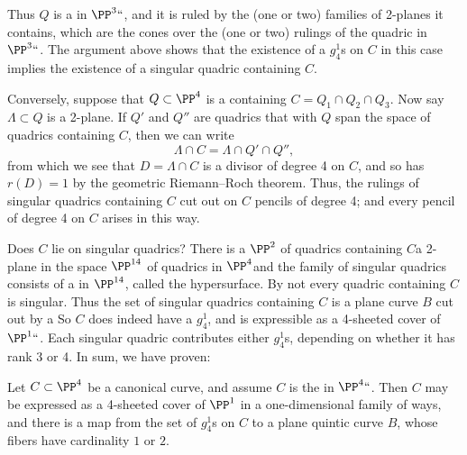 Thus $Q$ is a
%
in $\PP^3` `$, and it is ruled by
the (one or two) families of 2-planes it contains, which are the cones
over the (one or two) rulings of the quadric in $\PP^3` `$. The
argument above shows that the existence of a $g_4^1$s on $C$ in this
case implies the existence of a singular quadric containing $C$.

Conversely, suppose that $Q \subset \PP^4$ is a
containing $C = Q_1 \cap Q_2 \cap Q_3$. Now say $\Lambda \subset Q$ is
a 2-plane. If $Q'$ and $Q''$ are quadrics that with $Q$ span the
space of quadrics containing $C$, then we can write
$$
\Lambda \cap C = \Lambda \cap Q' \cap Q'',
$$
from which we see that $D = \Lambda \cap C$ is a divisor of degree 4
on $C$, and so has $r(D) = 1$ by the geometric Riemann--Roch theorem.
%
Thus, the rulings of  singular quadrics containing $C$ cut out on $C$
pencils of degree 4; and every pencil of degree 4 on $C$ arises in
this way.

Does $C$ lie on singular quadrics? There is a $\PP^2$ of quadrics
containing $C$\emdash a 2-plane in the space $\PP^{14}$ of quadrics in
$\PP^4$\emdash and the family of singular quadrics  consists of a
%
in $\PP^{14}$, called the
%
%
hypersurface. By
not every quadric containing $C$
is singular. Thus the set of singular quadrics containing $C$ is a
plane curve $B$ cut out by a
%
So $C$ does indeed have
a $g^1_4$, and is expressible as a
4-sheeted cover of~$\PP^1` `$.
%
Each singular quadric contributes either
$g^1_4$s, depending on
whether it has rank 3 or 4. In sum, we have proven:

\begin{proposition}
Let $C \subset \PP^4$ be a canonical curve, and assume $C$ is the
%
in $\PP^4` `$. Then $C$ may be
expressed as a 4-sheeted cover of $\PP^1$ in a one-dimensional family
of ways, and there is a map from the set
%
of $g^1_4$s on $C$
to a plane quintic curve $B$, whose fibers have cardinality $1$ or $2$.
\unif
\end{proposition}

